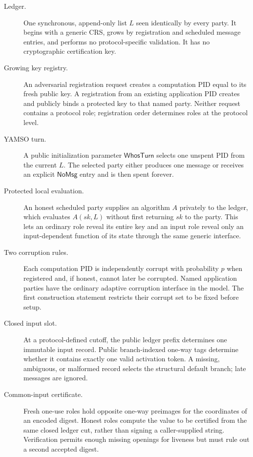 \begin{description}
  \item[Ledger.] One synchronous, append-only list $L$ seen identically by
    every party.  It begins with a generic CRS, grows by registration and
    scheduled message entries, and performs no protocol-specific validation.
    It has no cryptographic certification key.

  \item[Growing key registry.] An adversarial registration request creates a
    computation PID equal to its fresh public key.  A registration from an
    existing application PID creates and publicly binds a protected key to
    that named party.  Neither request contains a protocol role; registration
    order determines roles at the protocol level.

  \item[YAMSO turn.] A public initialization parameter
    $\mathsf{WhosTurn}$ selects one unspent PID from the current $L$.  The
    selected party either produces one message or receives an explicit
    $\mathsf{NoMsg}$ entry and is then spent forever.

  \item[Protected local evaluation.] An honest scheduled party supplies an
    algorithm $A$ privately to the ledger, which evaluates $A(sk,L)$ without
    first returning $sk$ to the party.  This lets an ordinary role reveal its
    entire key and an input role reveal only an input-dependent function of
    its state through the same generic interface.

  \item[Two corruption rules.] Each computation PID is independently corrupt
    with probability $p$ when registered and, if honest, cannot later be
    corrupted.  Named application parties have the ordinary adaptive
    corruption interface in the model.  The first construction statement
    restricts their corrupt set to be fixed before setup.

  \item[Closed input slot.] At a protocol-defined cutoff, the public ledger
    prefix determines one immutable input record.  Public branch-indexed
    one-way tags determine whether it contains exactly one valid activation
    token.  A missing, ambiguous, or malformed record selects the structural
    default branch; late messages are ignored.

  \item[Common-input certificate.] Fresh one-use roles hold opposite one-way
    preimages for the coordinates of an encoded digest.  Honest roles compute
    the value to be certified from the same closed ledger cut, rather than
    signing a caller-supplied string.  Verification permits enough missing
    openings for liveness but must rule out a second accepted digest.


\end{description}
